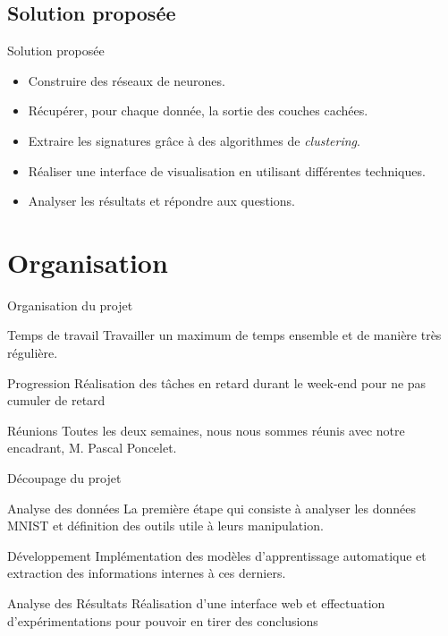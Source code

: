 \documentclass[10pt,handout]{beamer}
\newif\ifplacelogo %
\begin{document}
\subsection{Solution proposée}
\begin{frame}{Solution proposée}
    \begin{itemize}
        \item Construire des réseaux de neurones.
        \item Récupérer, pour chaque donnée, la sortie des couches cachées.
        \item Extraire les signatures grâce à des algorithmes de \textit{clustering}.
        \item Réaliser une interface de visualisation en utilisant différentes techniques.
        \item Analyser les résultats et répondre aux questions.
    \end{itemize}
\end{frame}

\section{Organisation}
\begin{frame}{Organisation du projet}

    \begin{block}{Temps de travail}
        Travailler un maximum
        de temps ensemble et de manière très régulière.
    \end{block}

    \begin{block}{Progression}
        Réalisation des tâches en retard durant le
        week-end pour ne pas cumuler de retard
    \end{block}

    \begin{block}{Réunions}
        Toutes les deux semaines, nous nous sommes réunis avec notre encadrant, M. Pascal Poncelet.
    \end{block}
\end{frame}
\placelogofalse
\begin{frame}{Découpage du projet}
    \begin{block}{Analyse des données}
        La première étape qui consiste à analyser les données MNIST et définition des outils utile à leurs manipulation.
    \end{block}

    \begin{block}{Développement}
        Implémentation des modèles d'apprentissage automatique et extraction des informations internes à ces derniers.
    \end{block}

    \begin{block}{Analyse des Résultats}
        Réalisation d'une interface web et effectuation d'expérimentations pour pouvoir en tirer des conclusions
    \end{block}
\end{frame}
\placelogotrue
\end{document}
